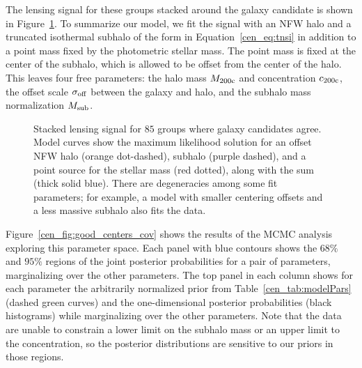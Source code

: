 The lensing signal for these groups stacked around the galaxy
candidate is shown in Figure~\ref{cen_fig:good_centers_ds}. To summarize
our model, we fit the signal with an NFW halo and a truncated
isothermal subhalo of the form in Equation~\eqref{cen_eq:tnsi} in addition
to a point mass fixed by the photometric stellar mass. The point mass is
fixed at the center of the subhalo, which is allowed to be offset
from the center of the halo. This leaves four free parameters:
the halo mass $M_{\rm 200c}$ and concentration $c_{\rm 200c}$, the
offset scale $\sigma_{\rm off}$ between the galaxy and halo, and the
subhalo mass normalization $M_{\rm sub}$.

\begin{figure}[htb]
\caption{Stacked lensing signal for $85$ groups
  where galaxy candidates agree. Model curves show the maximum
  likelihood solution for an offset NFW halo (orange dot-dashed),
  subhalo (purple dashed), and a point source for the stellar
  mass (red dotted), along with the sum (thick solid blue). There are
  degeneracies among some fit parameters; for example, a model with
  smaller centering offsets and a less massive subhalo also fits the data.}
\label{cen_fig:good_centers_ds}
\end{figure}
 
Figure~\ref{cen_fig:good_centers_cov} shows the results of the MCMC analysis 
exploring this parameter
space. Each panel with blue contours shows the $68\%$ and $95\%$
regions of the joint posterior probabilities for a pair of parameters,
marginalizing over the other parameters. The top panel in each column
shows for each parameter the arbitrarily normalized prior from
Table~\ref{cen_tab:modelPars} (dashed
green curves) and the one-dimensional posterior probabilities (black
histograms) while marginalizing over the other parameters. Note that
the data are unable to constrain a lower limit on the subhalo mass or
an upper limit to the concentration, so the posterior distributions
are sensitive to our priors in those regions.

\begin{figure*}[htb]
\caption{Posteriors for the four parameters of a general offset model
  discussed in the text, applied to the lensing signal from
  Figure~\ref{cen_fig:good_centers_ds}. Blue contours show $68\%$ and
  $95\%$ regions for the pair of parameters noted along the axes,
  marginalized over the other parameters. White crosses mark the
  maximum likelihood parameters. Top panels show the
  posterior distributions for single parameters while marginalizing
  over the others (black histograms), along with arbitrarily
  normalized priors (green dashed curves).}
\label{cen_fig:good_centers_cov}
\end{figure*}


